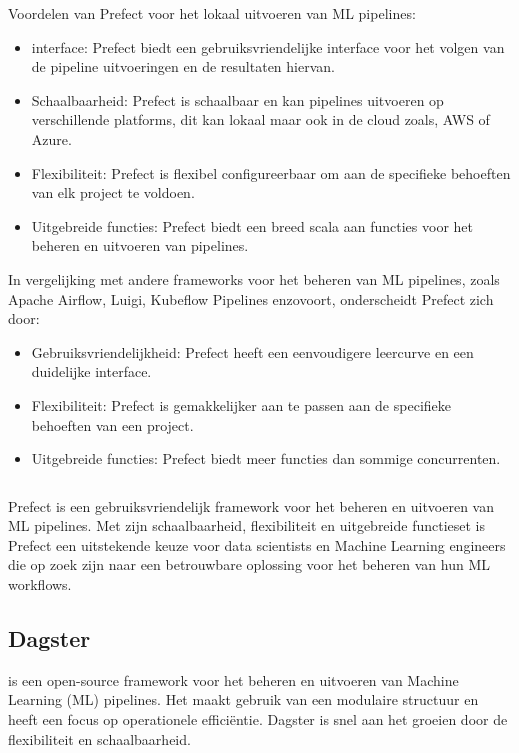Voordelen van Prefect voor het lokaal uitvoeren van ML pipelines:

\begin{itemize}
  \item interface: Prefect biedt een gebruiksvriendelijke interface voor het volgen van de pipeline uitvoeringen en de resultaten hiervan.
  \item Schaalbaarheid: Prefect is schaalbaar en kan pipelines uitvoeren op verschillende platforms, dit kan lokaal maar ook in de cloud zoals, AWS of Azure.
  \item Flexibiliteit: Prefect is flexibel configureerbaar om aan de specifieke behoeften van elk project te voldoen.
  \item Uitgebreide functies: Prefect biedt een breed scala aan functies voor het beheren en uitvoeren van pipelines.
\end{itemize}

In vergelijking met andere frameworks voor het beheren van ML pipelines, zoals Apache Airflow, Luigi, Kubeflow Pipelines enzovoort, onderscheidt Prefect zich door:

\begin{itemize}
  \item Gebruiksvriendelijkheid: Prefect heeft een eenvoudigere leercurve en een duidelijke interface.
  \item Flexibiliteit: Prefect is gemakkelijker aan te passen aan de specifieke behoeften van een project.
  \item Uitgebreide functies: Prefect biedt meer functies dan sommige concurrenten.
\end{itemize}
\begin{verbatim}
\end{verbatim}
Prefect is een gebruiksvriendelijk framework voor het beheren en uitvoeren van ML pipelines. Met zijn schaalbaarheid, flexibiliteit en uitgebreide functieset is Prefect een uitstekende keuze voor data scientists en Machine Learning engineers die op zoek zijn naar een betrouwbare oplossing voor het beheren van hun ML workflows.
\subsection{Dagster}
\textcite{Dagster2024} is een open-source framework voor het beheren en uitvoeren van Machine Learning (ML) pipelines. Het maakt gebruik van een modulaire structuur en heeft een focus op operationele efficiëntie. Dagster is snel aan het groeien door de flexibiliteit en schaalbaarheid.

